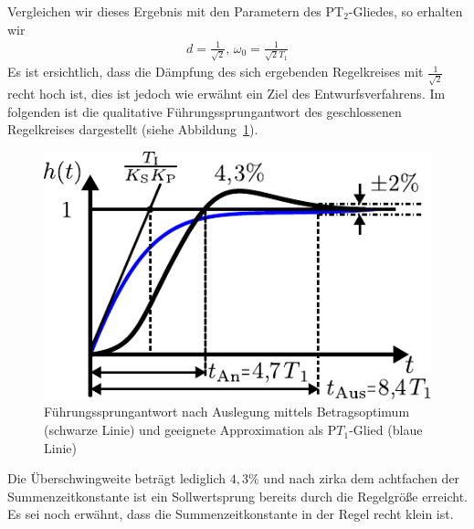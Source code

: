 %
Vergleichen wir dieses Ergebnis mit den Parametern des PT$_{2}$-Gliedes, so erhalten wir 
%
\begin{equation}
\begin{aligned}
%
d = \frac{1}{\sqrt{2}},\, \omega_{0}=\frac{1}{\sqrt{2}T_{1}}
%
\end{aligned}
\end{equation}
%
Es ist ersichtlich, dass die Dämpfung des sich ergebenden Regelkreises mit $\frac{1}{\sqrt{2}}$ recht hoch ist, dies ist jedoch wie erwähnt ein Ziel des Entwurfsverfahrens. Im folgenden ist die qualitative Führungssprungantwort des geschlossenen Regelkreises dargestellt (siehe Abbildung~\ref{fig:betragsoptimum}). 
%
\begin{figure}[ht!]
	\centering
	\includegraphics[width=0.45\linewidth]{Abbildungen/Reglerentwurf/PDF/SprungantwortBetragsoptimum.pdf}
	\caption{Führungssprungantwort nach Auslegung mittels Betragsoptimum (schwarze Linie) und geeignete Approximation als P$T_{1}$-Glied (blaue Linie)}
	\label{fig:betragsoptimum}
\end{figure}
%
Die Überschwingweite beträgt lediglich $4,3\%$ und nach zirka dem achtfachen der Summenzeitkonstante ist ein Sollwertsprung bereits durch die Regelgröße erreicht. Es sei noch erwähnt, dass die Summenzeitkonstante in der Regel recht klein ist.
%
